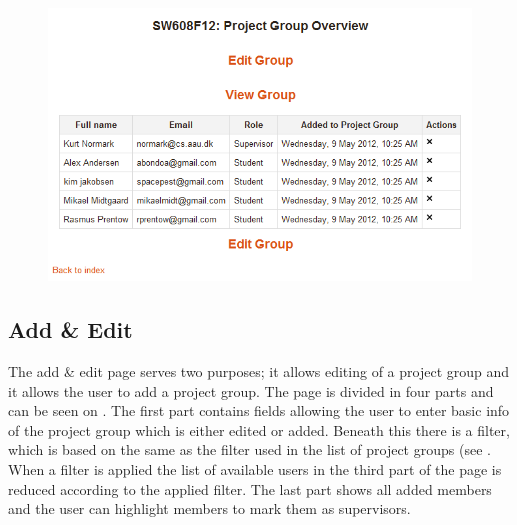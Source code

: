 \begin{figure}
	\centering
		\includegraphics[width=\textwidth]{images/moodleprojectgroupoverview.png}
	\label{fig:moodleprojectgroupoverview}
\end{figure}
\FloatBarrier

\subsection{Add \& Edit}
\label{sec:addandedit}
The add \& edit page serves two purposes; it allows editing of a project group and it allows the user to add a project group.
The page is divided in four parts and can be seen on . 
The first part contains fields allowing the user to enter basic info of the project group which is either edited or added. 
Beneath this there is a filter, which is based on the same as the filter used in the list of project groups (see . 
When a filter is applied the list of available users in the third part of the page is reduced according to the applied filter. 
The last part shows all added members and the user can highlight members to mark them as supervisors. 


